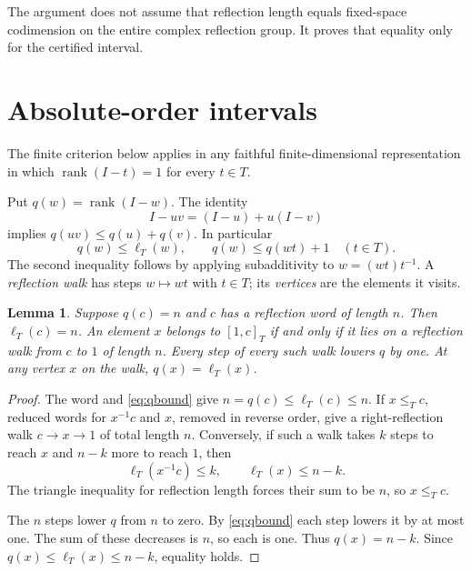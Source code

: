 \documentclass[11pt]{article}
\newtheorem{lemma}[theorem]{Lemma}
\theoremstyle{definition}
\newcommand{\rank}{\operatorname{rank}}
\begin{document}
The argument does not assume that reflection length equals fixed-space
codimension on the entire complex reflection group. It proves that
equality only for the certified interval.

\section{Absolute-order intervals}\label{sec:finite}
The finite criterion below applies in any faithful finite-dimensional
representation in which $\rank(I-t)=1$ for every $t\in T$.

Put $q(w)=\rank(I-w)$. The identity
\[
                    I-uv=(I-u)+u(I-v)
\]
implies $q(uv)\leq q(u)+q(v)$. In particular
\begin{equation}\label{eq:qbound}
 q(w)\leq\ell_T(w),\qquad q(w)\leq q(wt)+1\quad(t\in T).
\end{equation}
The second inequality follows by applying subadditivity to
$w=(wt)t^{-1}$. A \emph{reflection walk} has steps
$w\longmapsto wt$ with $t\in T$; its \emph{vertices} are the elements
it visits.

\begin{lemma}\label{lem:walk}
Suppose $q(c)=n$ and $c$ has a reflection word of length $n$.
Then $\ell_T(c)=n$. An element $x$ belongs to $[1,c]_T$ if and only
if it lies on a reflection walk from $c$ to $1$ of length $n$.
Every step of every such walk lowers $q$ by one. At any vertex $x$
on the walk, $q(x)=\ell_T(x)$.
\end{lemma}
\begin{proof}
The word and \eqref{eq:qbound} give
$n=q(c)\leq\ell_T(c)\leq n$.
If $x\leq_T c$, reduced words for $x^{-1}c$ and $x$, removed in
reverse order, give a right-reflection walk $c\to x\to1$ of total
length $n$. Conversely, if such a walk takes $k$ steps to reach $x$
and $n-k$ more to reach $1$, then
\[
 \ell_T(x^{-1}c)\leq k,\qquad \ell_T(x)\leq n-k.
\]
The triangle inequality for reflection length forces their sum to be
$n$, so $x\leq_T c$.

The $n$ steps lower $q$ from $n$ to zero. By \eqref{eq:qbound} each
step lowers it by at most one. The sum of these decreases is $n$,
so each is one. Thus $q(x)=n-k$. Since
$q(x)\leq\ell_T(x)\leq n-k$, equality holds.
\end{proof}
\end{document}
